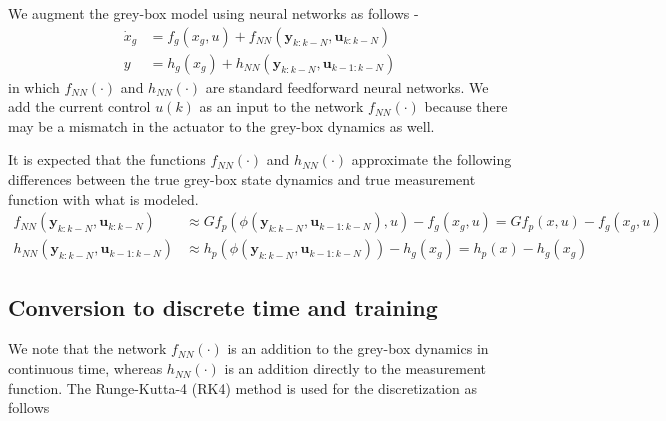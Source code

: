 \documentclass{article}
\begin{document}
We augment the grey-box model using 
neural networks as follows -
\begin{align*}
\dot x_g &= f_g(x_g, u) + 
f_{NN}(\mathbf{y}_{k:k-N}, \mathbf{u}_{k:k-N})\\
y &= h_g(x_g) + h_{NN}(\mathbf{y}_{k:k-N}, \mathbf{u}_{k-1:k-N})
\end{align*}
in which $f_{NN}(\cdot)$ and $h_{NN}(\cdot)$
are standard feedforward neural networks. We add the current 
control $u(k)$ as an input to the network $f_{NN}(\cdot)$ because 
there may be a mismatch in the actuator to the grey-box dynamics
as well.

It is expected that the functions $f_{NN}(\cdot)$ 
and $h_{NN}(\cdot)$ approximate
the following differences between the true grey-box state dynamics
and true measurement function with what is modeled.
\begin{align*}
  f_{NN}(\mathbf{y}_{k:k-N}, \mathbf{u}_{k:k-N}) &\approx 
      Gf_p(\phi(\mathbf{y}_{k:k-N}, \mathbf{u}_{k-1:k-N}), u) - f_g(x_g, u) = 
      Gf_p(x, u) - f_g(x_g, u) \\
      h_{NN}(\mathbf{y}_{k:k-N}, \mathbf{u}_{k-1:k-N}) &\approx 
      h_p(\phi(\mathbf{y}_{k:k-N}, \mathbf{u}_{k-1:k-N})) - h_g(x_g) = 
      h_p(x) - h_g(x_g) 
\end{align*}  

\subsection{Conversion to discrete time and training}
We note that the network $f_{NN}(\cdot)$ is an addition 
to the grey-box dynamics in continuous time, whereas 
$h_{NN}(\cdot)$ is an addition directly to the 
measurement function. The Runge-Kutta-4 (RK4) method 
is used for the discretization as follows
\end{document}
